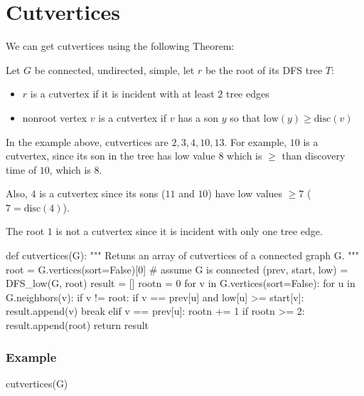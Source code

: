 \section{Cutvertices}

We can get cutvertices using the following Theorem:

\begin{theorem}
Let $G$ be connected, undirected, simple, let $r$ be the root of its DFS tree $T$:
\begin{itemize}
\item $r$ is a cutvertex if it is incident with at least $2$ tree edges
\item nonroot vertex $v$ is a cutvertex if $v$ has a son $y$ so that $\mathrm{low}(y) \geq \mathrm{disc}(v)$
\end{itemize}
\end{theorem}

In the example above, cutvertices are $2, 3, 4, 10, 13$. For example, $10$ is a cutvertex, since its son in the tree has low value $8$ which is $\geq$ than discovery time of $10$, which is $8$.

Also, $4$ is a cutvertex since its sons ($11$ and $10$) have low values $\geq 7$
($7 = \mathrm{disc}(4)$).

The root $1$ is not a cutvertex since it is incident with only one tree edge.

\medskip
\begin{sageCell}
def cutvertices(G):
    """
    Retuns an array of cutvertices of a connected graph G.
    """
    root = G.vertices(sort=False)[0]     # assume G is connected
    (prev, start, low) = DFS_low(G, root)
    result = []
    rootn = 0
    for v in G.vertices(sort=False):
        for u in G.neighbors(v):
            if v != root:
                if v == prev[u] and low[u] >= start[v]:
                    result.append(v)
                    break
            elif v == prev[u]:
                rootn += 1
    if rootn >= 2:
        result.append(root)
    return result
\end{sageCell}

\subsubsection*{Example}

\begin{sageCell}
    cutvertices(G)
\end{sageCell}
\begin{outCell}
    [2, 3, 4, 13, 10]
\end{outCell}

